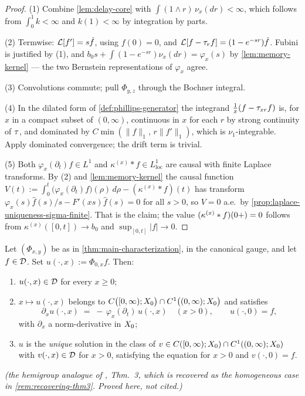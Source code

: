\begin{proof}
\leanok
(1) Combine \ref{lem:delay-core} with $\int (1 \wedge r)\,\nu_x(dr) < \infty$, which follows
from $\int_0^1 k < \infty$ and $k(1) < \infty$ by integration by parts.

(2) Termwise: $\mathcal{L}[f'] = s\hat f$, using $f(0) = 0$, and $\mathcal{L}[f - \tau_rf] = (1 - e^{-sr})\hat f$.
Fubini is justified by (1), and $b_0 s + \int(1 - e^{-sr})\nu_x(dr) = \varphi_x(s)$ by
\ref{lem:memory-kernel} --- the two Bernstein representations of $\varphi_x$ agree.

(3) Convolutions commute; pull $\Phi_{y,z}$ through the Bochner integral.

(4) In the dilated form of \ref{def:phillips-generator} the integrand
$\tfrac1x(f - \tau_{xr}f)$ is, for $x$ in a compact subset of $(0,\infty)$, continuous in $x$ for
each $r$ by strong continuity of $\tau$, and dominated by $C\min(\|f\|_1,\, r\|f'\|_1)$, which is
$\nu_1$-integrable. Apply dominated convergence; the drift term is trivial.

(5) Both $\varphi_x(\partial_t)f \in L^1$ and $\kappa^{(x)} * f \in L^1_{\mathrm{loc}}$ are
causal with finite Laplace transforms. By (2) and \ref{lem:memory-kernel} the causal function
$V(t) := \int_0^t \bigl(\varphi_x(\partial_t)f\bigr)(\rho)\,d\rho - (\kappa^{(x)} * f)(t)$ has
transform $\varphi_x(s)\hat f(s)/s - F'(xs)\hat f(s) = 0$ for all $s > 0$, so $V = 0$ a.e.\ by
\ref{prop:laplace-uniqueness-sigma-finite}. That is the claim; the value $(\kappa^{(x)}*f)(0{+}) = 0$
follows from $\kappa^{(x)}([0,t]) \to b_0$ and $\sup_{[0,t]}|f| \to 0$.
\end{proof}

\begin{theorem}\label{thm:scale-cauchy}
Let $(\Phi_{x,y})$ be as in \ref{thm:main-characterization}, in the canonical gauge, and let
$f \in \mathcal{D}$. Set $u(\cdot, x) := \Phi_{0,x} f$. Then:
\begin{enumerate}
\item $u(\cdot, x) \in \mathcal{D}$ for every $x \ge 0$;
\item $x \mapsto u(\cdot, x)$ belongs to
$C\bigl([0,\infty); X_0\bigr) \cap C^1\bigl((0,\infty); X_0\bigr)$ and satisfies
\[
  \partial_x u(\cdot, x) \;=\; -\,\varphi_x(\partial_t)\,u(\cdot, x) \quad (x > 0),
  \qquad u(\cdot, 0) = f,
\]
with $\partial_x$ a norm-derivative in $X_0$;
\item $u$ is the \emph{unique} solution in the class of
$v \in C([0,\infty); X_0) \cap C^1((0,\infty); X_0)$ with $v(\cdot, x) \in \mathcal{D}$ for $x > 0$,
satisfying the equation for $x > 0$ and $v(\cdot, 0) = f$.
\end{enumerate}
\statusT\quad\emph{(the hemigroup analogue of , Thm.~3, which
is recovered as the homogeneous case in \ref{rem:recovering-thm3}. Proved here, not cited.)}
\end{theorem}

